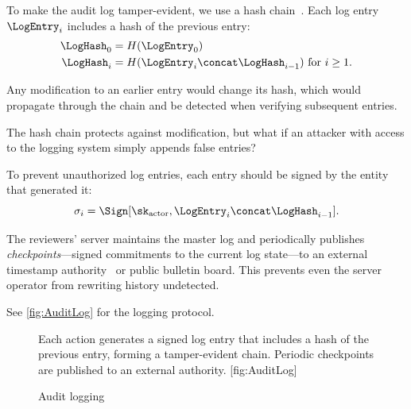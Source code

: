 To make the audit log tamper-evident, we use a hash
chain~\autocite{SchneierKelsey1999logs}.
Each log entry~\(\LogEntry_i\) includes a hash of the previous entry:
\begin{align*}
  \LogHash_0 &= H(\LogEntry_0) \\
  \LogHash_i &= H(\LogEntry_i \concat \LogHash_{i-1}) \text{ for } i \geq 1.
\end{align*}

Any modification to an earlier entry would change its hash, which would 
propagate through the chain and be detected when verifying subsequent entries.

\begin{exercise}
  The hash chain protects against modification, but what if an attacker with 
  access to the logging system simply appends false entries?
\end{exercise}

To prevent unauthorized log entries, each entry should be signed by the entity 
that generated it:
\[
  \sigma_i = \Sign[\sk_{\text{actor}}, \LogEntry_i \concat \LogHash_{i-1}].
\]

The reviewers' server maintains the master log and periodically publishes
\emph{checkpoints}---signed commitments to the current log state---to an
external timestamp authority~\autocite{HaberStornetta1991,RFC3161} or
public bulletin board.
This prevents even the server operator from rewriting history undetected.

See \cref{fig:AuditLog} for the logging protocol.

\begin{figure}
  \begin{sidecaption}{%
    Each action generates a signed log entry that includes a hash of the 
    previous entry, forming a tamper-evident chain.
    Periodic checkpoints are published to an external authority.
  }[fig:AuditLog]
  \flushright
  \begin{msc}
    [/msc/action width=0.4\linewidth]
    {Audit logging}
      \nextlevel[2]
      \nextlevel
      \nextlevel[2]
      \nextlevel
      \nextlevel
      \nextlevel
  \end{msc}
  \end{sidecaption}
\end{figure}

